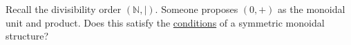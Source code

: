 Recall the divisibility order $(\mathbb{N}, |)$. Someone proposes $(0,+)$ as the monoidal unit and product. Does this satisfy the \href{doc/1 math/Seven Sketches in Compositionality/Chapter 2: Resource theories/2 Symmetric monoidal preorders/1 Definition and first examples/1 Symmetric monoidal structure on a preorder}{conditions} of a symmetric monoidal structure?